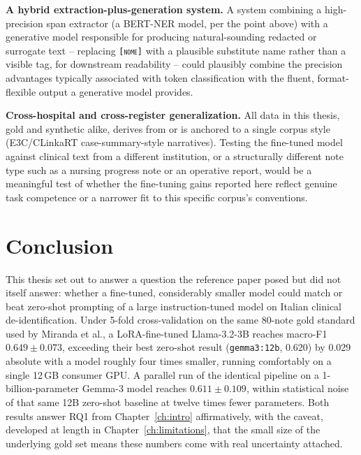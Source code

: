 \documentclass[12pt,a4paper]{report}
\newcommand{\NOME}{\textsc{nome}}
\begin{document}
\textbf{A hybrid extraction-plus-generation system.} A system combining a high-precision span extractor (a BERT-NER model, per the point above) with a generative model responsible for producing natural-sounding redacted or surrogate text -- replacing \texttt{[\NOME{}]} with a plausible substitute name rather than a visible tag, for downstream readability -- could plausibly combine the precision advantages typically associated with token classification with the fluent, format-flexible output a generative model provides.

\textbf{Cross-hospital and cross-register generalization.} All data in this thesis, gold and synthetic alike, derives from or is anchored to a single corpus style (E3C/CLinkaRT case-summary-style narratives). Testing the fine-tuned model against clinical text from a different institution, or a structurally different note type such as a nursing progress note or an operative report, would be a meaningful test of whether the fine-tuning gains reported here reflect genuine task competence or a narrower fit to this specific corpus's conventions.

\chapter{Conclusion}
\label{ch:conclusion}

This thesis set out to answer a question the reference paper posed but did not itself answer: whether a fine-tuned, considerably smaller model could match or beat zero-shot prompting of a large instruction-tuned model on Italian clinical de-identification. Under 5-fold cross-validation on the same 80-note gold standard used by Miranda et al., a LoRA-fine-tuned Llama-3.2-3B reaches macro-F1 $0.649 \pm 0.073$, exceeding their best zero-shot result (\texttt{gemma3:12b}, 0.620) by 0.029 absolute with a model roughly four times smaller, running comfortably on a single 12\,GB consumer GPU. A parallel run of the identical pipeline on a 1-billion-parameter Gemma-3 model reaches $0.611 \pm 0.109$, within statistical noise of that same 12B zero-shot baseline at twelve times fewer parameters. Both results answer RQ1 from Chapter~\ref{ch:intro} affirmatively, with the caveat, developed at length in Chapter~\ref{ch:limitations}, that the small size of the underlying gold set means these numbers come with real uncertainty attached.
\end{document}
